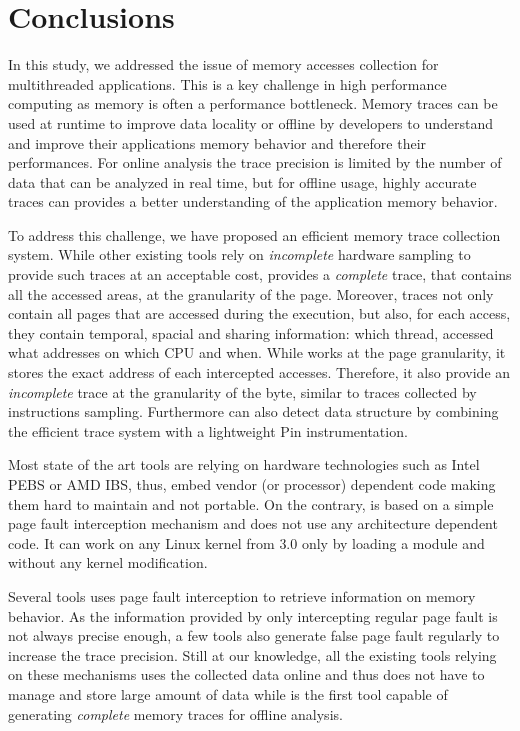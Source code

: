 \section{Conclusions}
\label{sec:cncl}

In this study, we addressed the issue of memory accesses collection for
multithreaded applications. This is a key challenge in high performance
computing as memory is often a performance
bottleneck. Memory traces can be used at runtime to improve data locality or
offline by developers to understand and improve their applications memory
behavior and therefore their performances. For online analysis the trace precision
is limited by the number of data that can be analyzed in real time, but for
offline usage, highly accurate traces can provides a better understanding of
the application memory behavior.

To address this challenge, we have proposed \Moca an efficient memory trace
collection system. While other existing tools
rely on \emph{incomplete} hardware sampling to
provide such traces at an acceptable cost, \Moca provides a \emph{complete}
trace, that contains all the accessed areas, at the granularity of the page.
Moreover, \Moca traces not only
contain all pages that are accessed during the execution, but also, 
for each access, they contain temporal, spacial and sharing
information: which thread, accessed what addresses on which CPU and when.
While \Moca works at the page granularity, it stores the exact
address of each intercepted accesses. Therefore, it also provide an
\emph{incomplete} trace at the granularity of the byte, similar to
traces collected by instructions sampling. Furthermore \Moca can also detect
data structure by combining the efficient trace system with a lightweight Pin
instrumentation.

Most state of the art tools are relying on hardware technologies such as Intel PEBS
or AMD IBS, thus, embed vendor (or processor) dependent code making them hard
to maintain and not portable. On the contrary, \Moca is based on a simple page
fault interception mechanism and does not use any architecture dependent code.
It can work on any Linux kernel from $3.0$ only by loading a module and
without any kernel modification.

Several tools uses page fault interception to retrieve information on memory
behavior. As the information provided by only intercepting regular page fault
is not always precise enough, a few tools also generate false page fault
regularly to increase the trace precision. Still at our knowledge, all the
existing tools relying on these mechanisms uses the collected data online and
thus does not have to manage and store large amount of data while \Moca is the
first tool capable of generating \emph{complete} memory traces for offline
analysis.

